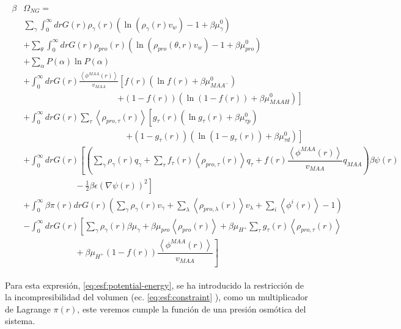 \begin{align}
	\begin{aligned}
		\beta&\Omega_{NG}=\\&  \sum_{\gamma}\int_0^\infty{dr G(r)\rho_\gamma(r)\left(\ln \left(\rho_\gamma (r)v_w\right) -1 + \beta\mu^0_\gamma\right)} \\
		& +\sum_\theta \int_0^\infty{dr G(r)\rho_{pro}(r)\left(\ln (\rho_{pro}(\theta,r)v_w)-1 + \beta\mu^0_{pro} \right)} \\
		& + \sum_{\alpha}{P(\alpha)\ln P(\alpha)} \\
		& +\int_0^\infty drG(r) \frac{\left<\phi^{MAA}(r)\right>}{v_{MAA}} \left[f(r)(\ln f(r)+ \beta\mu^0_{MAA^-})\right.\\
		&\qquad \qquad \qquad\qquad \qquad \quad \left.+(1-f(r))(\ln (1-f(r))+\beta\mu^0_{MAAH})\right] \\
		& +\int_0^\infty drG(r)\sum_\tau \left<\rho_{pro,\tau}(r)\right> \left[g_\tau(r)(\ln g_\tau(r)+ \beta\mu^0_{\tau p})\right.\\
		&\qquad\qquad \qquad\qquad \qquad \qquad\left.+(1-g_\tau(r))(\ln (1-g_\tau(r))+\beta\mu^0_{\tau d})\right] \\
		& +  \int_0^\infty drG(r)\left[\left(\sum_{\gamma } {\rho_\gamma(r) q_\gamma + \sum_\tau{f_\tau(r) \left<\rho_{pro,\tau}(r)\right> q_\tau} +  f(r)\dfrac{\left<\phi^{MAA}(r)\right>}{v_{MAA}}q_{MAA}}\right)\beta\psi(r) \right.\\  &\left. \hspace{6em}-\frac{1}{2}\beta\epsilon(\nabla\psi(r))^2 \right]\\
		&+ \int_0^\infty \beta\pi(r) drG(r){\left(\sum_{\gamma}\rho_\gamma(r) v_\gamma + \sum_{\lambda}{\left<\rho_{pro,\lambda}(r)\right>}{v_\lambda} + \sum_i\left<\phi^i(r)\right> -1\right)}\\
		& -\int_0^\infty drG(r)\left[\sum_{\gamma }{\rho_\gamma(r)\beta\mu_\gamma}
		+ \beta\mu_{pro} \left<\rho_{pro}(r)\right>
		+\beta\mu_{H^+}\sum_{\tau}{g_\tau(r)\left<\rho_{pro,\tau}(r)\right> } \right.\\
		& \left. \hspace{6em} +\beta\mu_{H^+}(1-f(r))\dfrac{\left<\phi^{MAA}(r)\right>}{v_{MAA}}\right]%
	\end{aligned}
	\label{eq:esf:potential-energy}
\end{align}


Para esta expresi\'on,  \ref{eq:esf:potential-energy}, se ha introducido la restricci\'on de la incompresibilidad del volumen (ec. \ref{eq:esf:constraint} ), como un  multiplicador  de  Lagrange $\pi(r)$, este veremos cumple la funci\'on de una presi\'on osm\'otica del sistema. 

